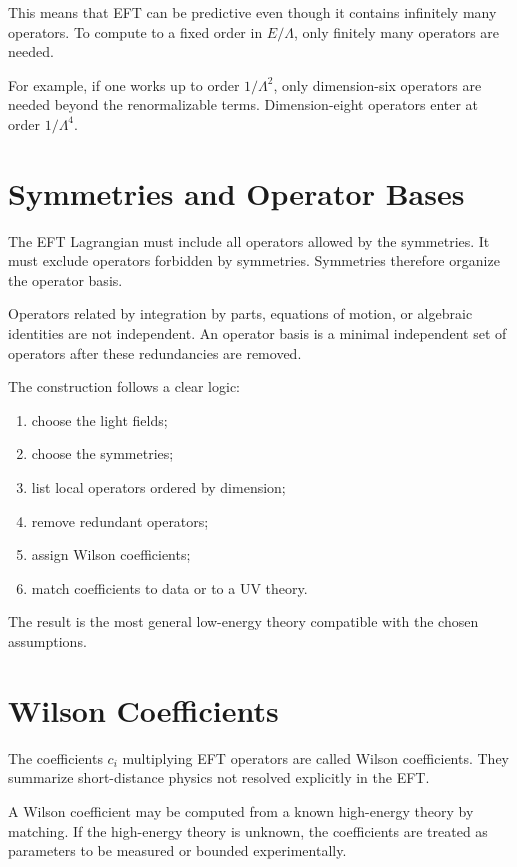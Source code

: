 This means that EFT can be predictive even though it contains infinitely many
operators. To compute to a fixed order in \(E/\Lambda\), only finitely many
operators are needed.

For example, if one works up to order \(1/\Lambda^2\), only dimension-six
operators are needed beyond the renormalizable terms. Dimension-eight operators
enter at order \(1/\Lambda^4\).

\section{Symmetries and Operator Bases}

The EFT Lagrangian must include all operators allowed by the symmetries. It must
exclude operators forbidden by symmetries. Symmetries therefore organize the
operator basis.

Operators related by integration by parts, equations of motion, or algebraic
identities are not independent. An operator basis is a minimal independent set of
operators after these redundancies are removed.

The construction follows a clear logic:
\begin{enumerate}
    \item choose the light fields;
    \item choose the symmetries;
    \item list local operators ordered by dimension;
    \item remove redundant operators;
    \item assign Wilson coefficients;
    \item match coefficients to data or to a UV theory.
\end{enumerate}
The result is the most general low-energy theory compatible with the chosen
assumptions.

\section{Wilson Coefficients}

The coefficients \(c_i\) multiplying EFT operators are called Wilson
coefficients. They summarize short-distance physics not resolved explicitly in
the EFT.

A Wilson coefficient may be computed from a known high-energy theory by
matching. If the high-energy theory is unknown, the coefficients are treated as
parameters to be measured or bounded experimentally.

